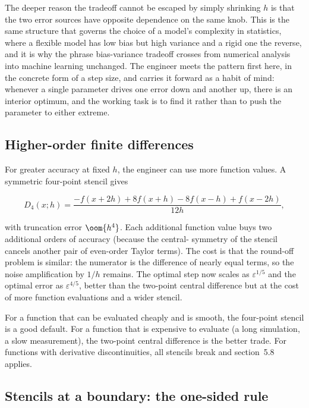 The deeper reason the tradeoff cannot be escaped by simply shrinking
$h$ is that the two error sources have opposite dependence on the same
knob. This is the same structure that governs the choice of a model's
complexity in statistics, where a flexible model has low bias but high
variance and a rigid one the reverse, and it is why the phrase
bias-variance tradeoff crosses from numerical analysis into machine
learning unchanged. The engineer meets the pattern first here, in the
concrete form of a step size, and carries it forward as a habit of
mind: whenever a single parameter drives one error down and another
up, there is an interior optimum, and the working task is to find it
rather than to push the parameter to either extreme.

\subsection{Higher-order finite differences}

For greater accuracy at fixed $h$, the engineer can use more
function values. A symmetric four-point stencil gives

\[
D_{4}(x; h) = \frac{-f(x + 2h) + 8 f(x + h) - 8 f(x - h) +
f(x - 2h)}{12 h},
\]

with truncation error $\oom{h^{4}}$. Each additional function
value buys two additional orders of accuracy (because the central-
symmetry of the stencil cancels another pair of even-order Taylor
terms). The cost is that the round-off problem is similar: the
numerator is the difference of nearly equal terms, so the noise
amplification by $1/h$ remains. The optimal step now scales as
$\varepsilon^{1/5}$ and the optimal error as $\varepsilon^{4/5}$,
better than the two-point central difference but at the cost of
more function evaluations and a wider stencil.

For a function that can be evaluated cheaply and is smooth, the
four-point stencil is a good default. For a function that is
expensive to evaluate (a long simulation, a slow measurement), the
two-point central difference is the better trade. For functions
with derivative discontinuities, all stencils break and section~5.8
applies.

\subsection{Stencils at a boundary: the one-sided rule}

